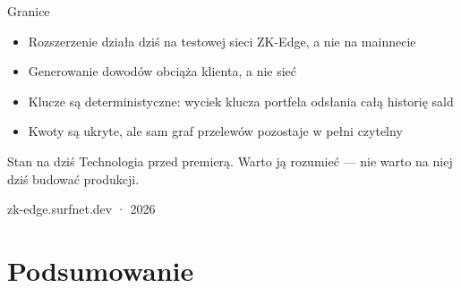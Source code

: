 \begin{frame}{Granice}
  \begin{itemize}
    \item Rozszerzenie działa dziś na testowej sieci ZK-Edge, a nie na mainnecie
    \item Generowanie dowodów obciąża klienta, a nie sieć
    \item Klucze są deterministyczne: wyciek klucza portfela odsłania całą historię sald
    \item Kwoty są ukryte, ale sam graf przelewów pozostaje w pełni czytelny
  \end{itemize}
  \vspace{0.15cm}
  \begin{alertblock}{Stan na dziś}
    Technologia przed premierą. Warto ją rozumieć --- nie warto na niej dziś
    budować produkcji.
  \end{alertblock}
  \vspace{-0.1cm}
  \begin{flushright}
    \textcolor{stplmuted}{\tiny zk-edge.surfnet.dev · 2026}
  \end{flushright}
\end{frame}

\section{Podsumowanie}

